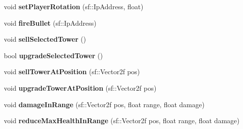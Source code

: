 \begin{DoxyCompactItemize}
\item 
\hypertarget{class_team_a66c9bffb7ce5f32ee8771f3875961fc2}{void {\bfseries set\+Player\+Rotation} (sf\+::\+Ip\+Address, float)}\label{class_team_a66c9bffb7ce5f32ee8771f3875961fc2}

\item 
\hypertarget{class_team_a3c3725e8f826170f03873c16a0a560ca}{void {\bfseries fire\+Bullet} (sf\+::\+Ip\+Address)}\label{class_team_a3c3725e8f826170f03873c16a0a560ca}

\item 
\hypertarget{class_team_a50bcf03d8950dde7a142d9cb9a1110d4}{void {\bfseries sell\+Selected\+Tower} ()}\label{class_team_a50bcf03d8950dde7a142d9cb9a1110d4}

\item 
\hypertarget{class_team_a7b8ea37e8b24f942c2dd024bf595c909}{bool {\bfseries upgrade\+Selected\+Tower} ()}\label{class_team_a7b8ea37e8b24f942c2dd024bf595c909}

\item 
\hypertarget{class_team_abecb0c490338b6ae71dcbbd91d9e7c6c}{void {\bfseries sell\+Tower\+At\+Position} (sf\+::\+Vector2f pos)}\label{class_team_abecb0c490338b6ae71dcbbd91d9e7c6c}

\item 
\hypertarget{class_team_a13572be9c3a1156c1daef187aa1d92ed}{void {\bfseries upgrade\+Tower\+At\+Position} (sf\+::\+Vector2f pos)}\label{class_team_a13572be9c3a1156c1daef187aa1d92ed}

\item 
\hypertarget{class_team_a1758930807a8d59939a59c594ec2c4b5}{void {\bfseries damage\+In\+Range} (sf\+::\+Vector2f pos, float range, float damage)}\label{class_team_a1758930807a8d59939a59c594ec2c4b5}

\item 
\hypertarget{class_team_afa99cdb8bba60b36c12628e0665f6c30}{void {\bfseries reduce\+Max\+Health\+In\+Range} (sf\+::\+Vector2f pos, float range, float damage)}\label{class_team_afa99cdb8bba60b36c12628e0665f6c30}

\end{DoxyCompactItemize}
